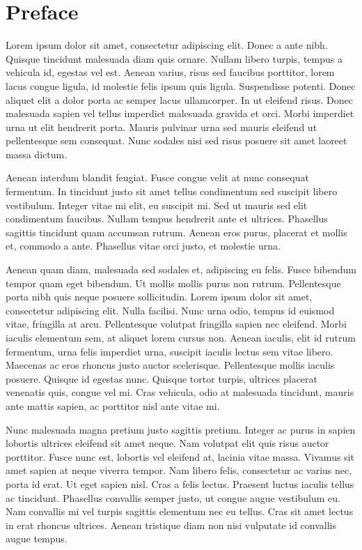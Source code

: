 \chapter{Preface}
Lorem ipsum dolor sit amet, consectetur adipiscing elit. Donec a ante nibh. Quisque tincidunt malesuada diam quis ornare. Nullam libero turpis, tempus a vehicula id, egestas vel est. Aenean varius, risus sed faucibus porttitor, lorem lacus congue ligula, id molestie felis ipsum quis ligula. Suspendisse potenti. Donec aliquet elit a dolor porta ac semper lacus ullamcorper. In ut eleifend risus. Donec malesuada sapien vel tellus imperdiet malesuada gravida et orci. Morbi imperdiet urna ut elit hendrerit porta. Mauris pulvinar urna sed mauris eleifend ut pellentesque sem consequat. Nunc sodales nisi sed risus posuere sit amet laoreet massa dictum.

Aenean interdum blandit feugiat. Fusce congue velit at nunc consequat fermentum. In tincidunt justo sit amet tellus condimentum sed suscipit libero vestibulum. Integer vitae mi elit, eu suscipit mi. Sed ut mauris sed elit condimentum faucibus. Nullam tempus hendrerit ante et ultrices. Phasellus sagittis tincidunt quam accumsan rutrum. Aenean eros purus, placerat et mollis et, commodo a ante. Phasellus vitae orci justo, et molestie urna.

Aenean quam diam, malesuada sed sodales et, adipiscing eu felis. Fusce bibendum tempor quam eget bibendum. Ut mollis mollis purus non rutrum. Pellentesque porta nibh quis neque posuere sollicitudin. Lorem ipsum dolor sit amet, consectetur adipiscing elit. Nulla facilisi. Nunc urna odio, tempus id euismod vitae, fringilla at arcu. Pellentesque volutpat fringilla sapien nec eleifend. Morbi iaculis elementum sem, at aliquet lorem cursus non. Aenean iaculis, elit id rutrum fermentum, urna felis imperdiet urna, suscipit iaculis lectus sem vitae libero. Maecenas ac eros rhoncus justo auctor scelerisque. Pellentesque mollis iaculis posuere. Quisque id egestas nunc. Quisque tortor turpis, ultrices placerat venenatis quis, congue vel mi. Cras vehicula, odio at malesuada tincidunt, mauris ante mattis sapien, ac porttitor nisl ante vitae mi.

Nunc malesuada magna pretium justo sagittis pretium. Integer ac purus in sapien lobortis ultrices eleifend sit amet neque. Nam volutpat elit quis risus auctor porttitor. Fusce nunc est, lobortis vel eleifend at, lacinia vitae massa. Vivamus sit amet sapien at neque viverra tempor. Nam libero felis, consectetur ac varius nec, porta id erat. Ut eget sapien nisl. Cras a felis lectus. Praesent luctus iaculis tellus ac tincidunt. Phasellus convallis semper justo, ut congue augue vestibulum eu. Nam convallis mi vel turpis sagittis elementum nec eu tellus. Cras sit amet lectus in erat rhoncus ultrices. Aenean tristique diam non nisi vulputate id convallis augue tempus.

